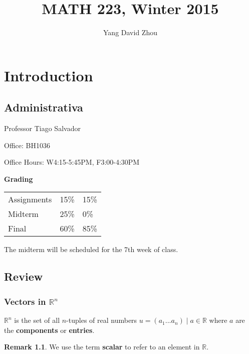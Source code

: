 \documentclass{report}
\theoremstyle{definition}
\newtheorem{myrem}{Remark}
\begin{document}
 

\title{MATH 223, Winter 2015} 

\author{Yang David Zhou}

\maketitle

\chapter{Introduction}

\section{Administrativa}

\raggedright

Professor Tiago Salvador \newline

Office: BH1036

Office Hours: W4:15-5:45PM, F3:00-4:30PM \newline

\textbf{Grading}

\begin{tabular}{ l l l }
  Assignments & 15\% & 15\% \\
  Midterm     & 25\% &  0\% \\
  Final       & 60\% & 85\% \\
\end{tabular} \newline

The midterm will be scheduled for the 7th week of class.

\section{Review}

\subsection{Vectors in \(\mathbb{R}^n\)}

\(\mathbb{R}^n\) is the set of all \(n\)-tuples of real numbers \(u=(a_1 ... a_n) \mid a\in \mathbb{R}\) where \(a\) are the \textbf{components} or \textbf{entries}.

\begin{myrem}
We use the term \textbf{scalar} to refer to an element in \(\mathbb{R}\).
\end{myrem}
\end{document}
